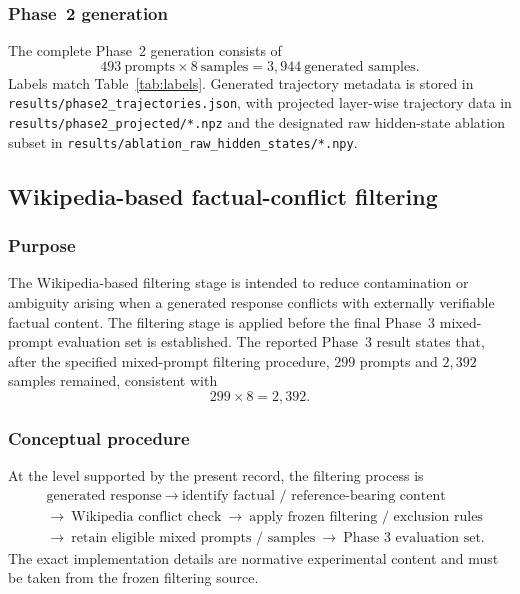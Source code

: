\documentclass{article}
\begin{document}
\subsubsection{Phase~2 generation}
The complete Phase~2 generation consists of
\begin{equation}
  493\ \text{prompts}\times 8\ \text{samples}=3{,}944\ \text{generated samples}.
\end{equation}
Labels match Table~\ref{tab:labels}.
Generated trajectory metadata is stored in
\texttt{results/phase2\_trajectories.json},
with projected layer-wise trajectory data in
\texttt{results/phase2\_projected/*.npz}
and the designated raw hidden-state ablation subset in
\texttt{results/ablation\_raw\_hidden\_states/*.npy}.

\subsection{{Wikipedia}-based factual-conflict filtering}
\label{app:b-wiki}

\subsubsection{Purpose}
The Wikipedia-based filtering stage is intended to reduce contamination or ambiguity arising when a generated response conflicts with externally verifiable factual content.
The filtering stage is applied before the final Phase~3 mixed-prompt evaluation set is established.
The reported Phase~3 result states that, after the specified mixed-prompt filtering procedure, $299$ prompts and $2{,}392$ samples remained, consistent with
\begin{equation}
  299\times 8=2{,}392.
\end{equation}

\subsubsection{Conceptual procedure}
At the level supported by the present record, the filtering process is
\begin{equation}
\begin{aligned}
&\text{generated response}
\ \rightarrow\
\text{identify factual / reference-bearing content}\\
&\rightarrow\
\text{{Wikipedia} conflict check}
\ \rightarrow\
\text{apply frozen filtering / exclusion rules}\\
&\rightarrow\
\text{retain eligible mixed prompts / samples}
\ \rightarrow\
\text{Phase~3 evaluation set}.
\end{aligned}
\end{equation}
The exact implementation details are normative experimental content and must be taken from the frozen filtering source.
\end{document}

